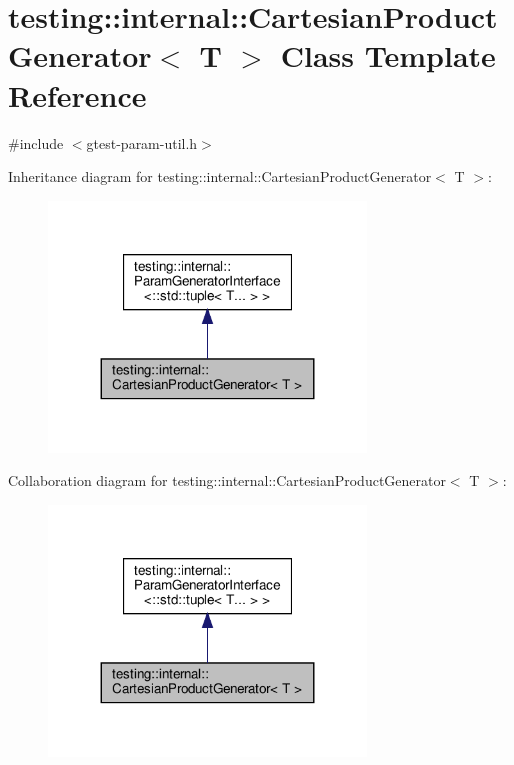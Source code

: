 \hypertarget{classtesting_1_1internal_1_1CartesianProductGenerator}{}\section{testing\+:\+:internal\+:\+:Cartesian\+Product\+Generator$<$ T $>$ Class Template Reference}
\label{classtesting_1_1internal_1_1CartesianProductGenerator}


{\ttfamily \#include $<$gtest-\/param-\/util.\+h$>$}



Inheritance diagram for testing\+:\+:internal\+:\+:Cartesian\+Product\+Generator$<$ T $>$\+:\nopagebreak
\begin{figure}[H]
\begin{center}
\leavevmode
\includegraphics[width=239pt]{classtesting_1_1internal_1_1CartesianProductGenerator__inherit__graph}
\end{center}
\end{figure}


Collaboration diagram for testing\+:\+:internal\+:\+:Cartesian\+Product\+Generator$<$ T $>$\+:\nopagebreak
\begin{figure}[H]
\begin{center}
\leavevmode
\includegraphics[width=239pt]{classtesting_1_1internal_1_1CartesianProductGenerator__coll__graph}
\end{center}
\end{figure}
